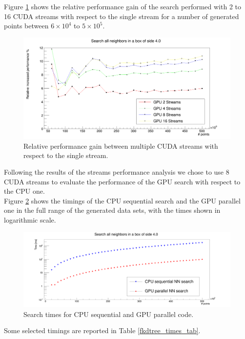 Figure \ref{fkdtree_streams} shows the relative performance gain of the search performed with 2 to 16 CUDA streams with respect to the single stream for a number of generated points between $6 \times 10^4$ to $5 \times 10^5$.\\
\begin{figure}
\includegraphics[width=\textwidth]{fkdtree/fkdStreams.png}
\caption{Relative performance gain between multiple CUDA streams with respect to the single stream.}
\label{fkdtree_streams}
\end{figure}

Following the results of the streams performance analysis we chose to use 8 CUDA streams to evaluate the performance of the GPU search with respect to the CPU one.\\

Figure \ref{fkdtree_search_times} shows the timings of the CPU sequential search and the GPU parallel one in the full range of the generated data sets, with the times shown in logarithmic scale.

\begin{figure}
\includegraphics[width=\textwidth]{fkdtree/fkdSearchTimes.png}
\caption{Search times for CPU sequential and GPU parallel code.}
\label{fkdtree_search_times}
\end{figure}

Some selected timings are reported in Table \ref{fkdtree_times_tab}.\\

